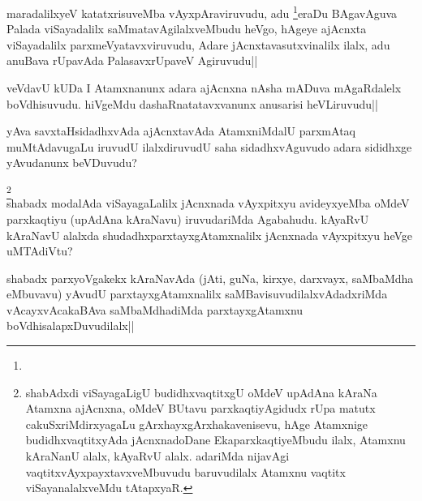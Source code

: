 \begin{artha} 
maradalilxyeV katatxrisuveMba vAyxpAraviruvudu, adu 
\footnote[2]{}eraDu BAgavAguva Palada viSayadalilx 
saMmatavAgilalxveMbudu heVgo, hAgeye ajAcnxta viSayadalilx 
parxmeVyatavxviruvudu, Adare jAcnxtavasutxvinalilx ilalx, adu anuBava 
rUpavAda PalasavxrUpaveV Agiruvudu||
\end{artha}

\begin{artha} 
veVdavU kUDa I Atamxnanunx adara ajAcnxna nAsha mADuva mAgaRdalelx 
boVdhisuvudu. hiVgeMdu dashaRnatatavxvanunx anusarisi heVLiruvudu||
\end{artha}

\begin{artha} 
yAva savxtaHsidadhxvAda ajAcnxtavAda AtamxniMdalU parxmAtaq 
muMtAdavugaLu iruvudU ilalxdiruvudU saha sidadhxvAguvudo adara 
sididhxge yAvudanunx beVDuvudu?  
\end{artha}


\begin{artha} 
\footnote[1]{shabAdxdi viSayagaLigU budidhxvaqtitxgU oMdeV upAdAna 
kAraNa Atamxna ajAcnxna, oMdeV BUtavu parxkaqtiyAgidudx rUpa matutx 
cakuSxriMdirxyagaLu gArxhayxgArxhakavenisevu, hAge Atamxnige 
budidhxvaqtitxyAda jAcnxnadoDane EkaparxkaqtiyeMbudu ilalx, Atamxnu 
kAraNanU alalx, kAyaRvU alalx. adariMda nijavAgi 
vaqtitxvAyxpayxtavxveMbuvudu baruvudilalx Atamxnu vaqtitx 
viSayanalalxveMdu tAtapxyaR.}\\
shabadx modalAda viSayagaLalilx jAcnxnada vAyxpitxyu avideyxyeMba 
oMdeV parxkaqtiyu (upAdAna kAraNavu) iruvudariMda Agabahudu. kAyaRvU 
kAraNavU alalxda shudadhxparxtayxgAtamxnalilx jAcnxnada vAyxpitxyu 
heVge uMTAdiVtu?
\end{artha}


\begin{artha} 
shabadx parxyoVgakekx kAraNavAda (jAti, guNa, kirxye, darxvayx, 
saMbaMdha eMbuvavu) yAvudU parxtayxgAtamxnalilx 
saMBavisuvudilalxvAdadxriMda vAcayxvAcakaBAva saMbaMdhadiMda 
parxtayxgAtamxnu boVdhisalapxDuvudilalx||
\end{artha}


